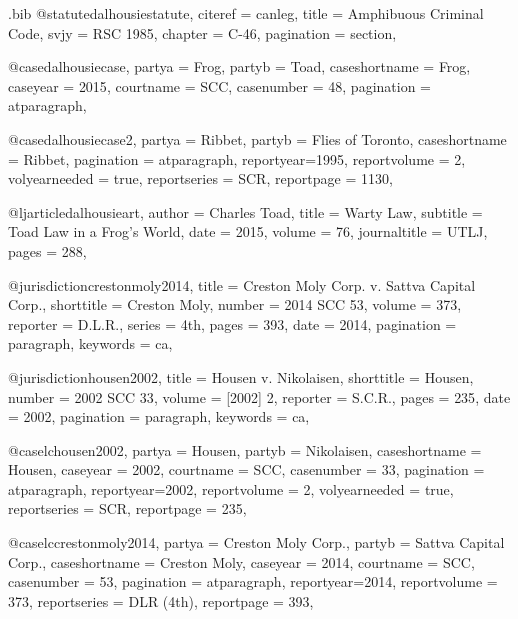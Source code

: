 \begin{filecontents*}[overwrite]{\jobname.bib}
@statute{dalhousiestatute,
citeref = {canleg},
title = {Amphibuous Criminal Code},
svjy = {RSC 1985},
chapter = {C-46},
pagination = {section},
}

@case{dalhousiecase,
  partya = {Frog}, 
  partyb = {Toad},
  caseshortname = {Frog},
  caseyear = {2015},
  courtname = {SCC},
  casenumber = {48},
  pagination = {atparagraph},
}

@case{dalhousiecase2,
  partya = {Ribbet}, 
  partyb = {Flies of Toronto},
  caseshortname = {Ribbet},
  pagination = {atparagraph},
  reportyear={1995},
  reportvolume = {2},
  volyearneeded = {true},
  reportseries = {SCR},
  reportpage = {1130},
}


@ljarticle{dalhousieart,
author = {Charles Toad},
title = {Warty Law},
subtitle = {Toad Law in a Frog's World},
date = {2015},
volume = {76},
journaltitle = {UTLJ},
pages = {288},
}



@jurisdiction{crestonmoly2014,
title = {Creston Moly Corp. v. Sattva Capital Corp.},
shorttitle = {Creston Moly},
number = {2014 SCC 53},
volume = {373},
reporter = {D.L.R.},
series = {4th},
pages = {393},
date = {2014},
pagination = {paragraph},
keywords = {ca},
}

@jurisdiction{housen2002,
title = {Housen v. Nikolaisen},
shorttitle = {Housen},
number = {2002 SCC 33},
volume = {[2002] 2},
reporter = {S.C.R.},
pages = {235},
date = {2002},
pagination = {paragraph},
keywords = {ca},
}

@case{lchousen2002,
  partya = {Housen}, 
  partyb = {Nikolaisen},
  caseshortname = {Housen},
  caseyear = {2002},
  courtname = {SCC},
  casenumber = {33},
  pagination = {atparagraph},
  reportyear={2002},
  reportvolume = {2},
  volyearneeded = {true},
  reportseries = {SCR},
  reportpage = {235},
}

@case{lccrestonmoly2014,
  partya = {Creston Moly Corp.\@}, 
  partyb = {Sattva Capital Corp.},
  caseshortname = {Creston Moly},
  caseyear = {2014},
  courtname = {SCC},
  casenumber = {53},
  pagination = {atparagraph},
  reportyear={2014},
  reportvolume = {373},
  reportseries = {DLR (4th)},
  reportpage = {393},
}





\end{filecontents*}
